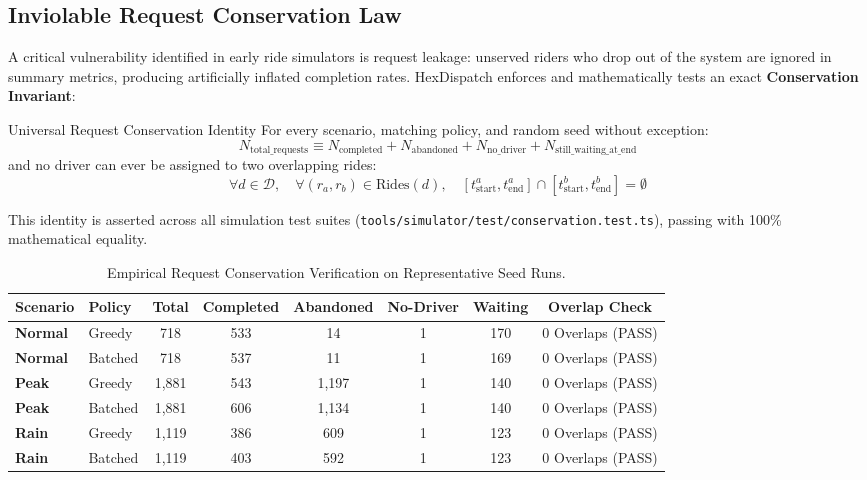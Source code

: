 \documentclass[11pt,a4paper]{article}
\begin{document}
\subsection{Inviolable Request Conservation Law}
A critical vulnerability identified in early ride simulators is request leakage: unserved riders who drop out of the system are ignored in summary metrics, producing artificially inflated completion rates. HexDispatch enforces and mathematically tests an exact \textbf{Conservation Invariant}:

\begin{invariantbox}{Universal Request Conservation Identity}
For every scenario, matching policy, and random seed without exception:
\begin{equation}
    N_{\text{total\_requests}} \equiv N_{\text{completed}} + N_{\text{abandoned}} + N_{\text{no\_driver}} + N_{\text{still\_waiting\_at\_end}}
\end{equation}
and no driver can ever be assigned to two overlapping rides:
\begin{equation}
    \forall d \in \mathcal{D}, \quad \forall (r_a, r_b) \in \text{Rides}(d), \quad [t_{\text{start}}^a, t_{\text{end}}^a] \cap [t_{\text{start}}^b, t_{\text{end}}^b] = \emptyset
\end{equation}
\end{invariantbox}

This identity is asserted across all simulation test suites (\texttt{tools/simulator/test/conservation.test.ts}), passing with 100\% mathematical equality.

\begin{table}[htbp]
\centering
\small
\begin{tabularx}{\textwidth}{l l c c c c c c}
\toprule
\textbf{Scenario} & \textbf{Policy} & \textbf{Total} & \textbf{Completed} & \textbf{Abandoned} & \textbf{No-Driver} & \textbf{Waiting} & \textbf{Overlap Check} \\
\midrule
\textbf{Normal} & Greedy & 718 & 533 & 14 & 1 & 170 & 0 Overlaps (PASS) \\
\rowcolor{HexLightBg}
\textbf{Normal} & Batched & 718 & 537 & 11 & 1 & 169 & 0 Overlaps (PASS) \\
\textbf{Peak} & Greedy & 1,881 & 543 & 1,197 & 1 & 140 & 0 Overlaps (PASS) \\
\rowcolor{HexLightBg}
\textbf{Peak} & Batched & 1,881 & 606 & 1,134 & 1 & 140 & 0 Overlaps (PASS) \\
\textbf{Rain} & Greedy & 1,119 & 386 & 609 & 1 & 123 & 0 Overlaps (PASS) \\
\rowcolor{HexLightBg}
\textbf{Rain} & Batched & 1,119 & 403 & 592 & 1 & 123 & 0 Overlaps (PASS) \\
\bottomrule
\end{tabularx}
\caption{Empirical Request Conservation Verification on Representative Seed Runs.}
\label{tab:conservation_results}
\end{table}
\end{document}
